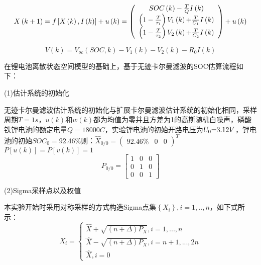\begin{equation}X\left( {k + 1} \right) = f\left[ {X\left( k \right),I\left( k \right)} \right] + u\left( k \right) = \left( {\begin{array}{*{20}{c}}
{SOC\left( k \right) - \frac{T}{Q}I\left( k \right)}\\
{\left( {1 - \frac{T}{{{\tau _1}}}} \right){V_1}\left( k \right){\rm{ + }}\frac{T}{{{C_1}}}I\left( k \right)}\\
{\left( {1 - \frac{T}{{{\tau _2}}}} \right){V_2}\left( k \right){\rm{ + }}\frac{T}{{{C_2}}}I\left( k \right)}
\end{array}} \right) + u\left( k \right)\end{equation}

\begin{equation}
V\left( k \right) = {V_{oc}}\left( {SOC,k} \right) - {V_1}\left( k \right) - {V_2}\left( k \right) - {R_0}I\left( k \right)
\end{equation}

在锂电池离散状态空间模型的基础上，基于无迹卡尔曼滤波的SOC估算流程如下：

(1)估计系统的初始化

	无迹卡尔曼滤波估计系统的初始化与扩展卡尔曼滤波估计系统的初始化相同，采样周期$T = 1s$，$u\left( k \right)$和$w\left( k \right)$都为均值为零并且方差为1的高斯随机白噪声，磷酸铁锂电池的额定电量$Q = 18000C$，实验锂电池的初始开路电压为${U_0}{\rm{ = }}3.12V$，锂电池的初始$SO{C_0} = 92.46\% $则：${\widehat X_{0/0}} = {\left( {\begin{array}{*{20}{c}}
{92.46\% }&0&0
\end{array}} \right)^T}$~$P\left[ {u\left( k \right)} \right] = P\left[ {v\left( k \right)} \right] = 1$
\[{P_{0/0}} = \left[ {\begin{array}{*{20}{c}}
1&0&0\\
0&1&0\\
0&0&1
\end{array}} \right]\]

(2)Sigma采样点以及权值

本实验开始时采用对称采样的方式构造Sigma点集$\left\{ {{X_i}} \right\},i = 1,..,n$，如下式所示：
\begin{equation}
{X_i} = \left\{ \begin{array}{l}
\hat X + \sqrt {(n + \Delta ){P_X}} ,i = 1,...,n\\
\hat X - \sqrt {(n + \Delta ){P_X}} ,i = n + 1,...,2n\\
\hat X,i = 0
\end{array} \right.
\end{equation}


